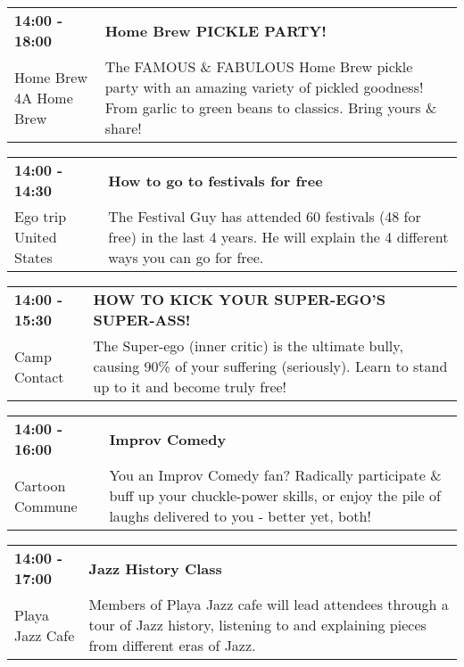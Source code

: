 \begin{tabular}{ p{1in} p{2.2in} }
    \textbf{14:00 - 18:00} & \textbf{Home Brew PICKLE PARTY!} \\
    Home Brew 4A Home Brew \newline  & The FAMOUS \& FABULOUS Home Brew pickle party with an amazing variety of pickled goodness! From garlic to green beans to classics. Bring yours \& share! \\
    \hline 
\end{tabular}
    
\begin{tabular}{ p{1in} p{2.2in} }
    \textbf{14:00 - 14:30} & \textbf{How to go to festivals for free} \\
    Ego trip \newline United States & The Festival Guy has attended 60 festivals (48 for free) in the last 4 years. He will explain the 4 different ways you can go for free. \\
    \hline 
\end{tabular}
    
\begin{tabular}{ p{1in} p{2.2in} }
    \textbf{14:00 - 15:30} & \textbf{HOW TO KICK YOUR SUPER-EGO'S SUPER-ASS!} \\
    Camp Contact \newline  & The Super-ego (inner critic) is the ultimate bully, causing 90\% of your suffering (seriously).  Learn to stand up to it and become truly free! \\
    \hline 
\end{tabular}
    
\begin{tabular}{ p{1in} p{2.2in} }
    \textbf{14:00 - 16:00} & \textbf{Improv Comedy} \\
    Cartoon Commune \newline  & You an Improv Comedy fan? Radically participate \& buff up your chuckle-power skills, or enjoy the pile of laughs delivered to you - better yet, both! \\
    \hline 
\end{tabular}
    
\begin{tabular}{ p{1in} p{2.2in} }
    \textbf{14:00 - 17:00} & \textbf{Jazz History Class} \\
    Playa Jazz Cafe \newline  & Members of Playa Jazz cafe will lead attendees through a tour of Jazz history, listening to and explaining pieces from different eras of Jazz. \\
    \hline 
\end{tabular}
    
